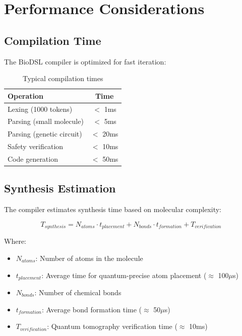\documentclass[12pt,a4paper]{article}
\begin{document}
\section{Performance Considerations}

\subsection{Compilation Time}

The BioDSL compiler is optimized for fast iteration:

\begin{table}[H]
\centering
\begin{tabular}{lc}
\toprule
\textbf{Operation} & \textbf{Time} \\
\midrule
Lexing (1000 tokens) & $<$ 1ms \\
Parsing (small molecule) & $<$ 5ms \\
Parsing (genetic circuit) & $<$ 20ms \\
Safety verification & $<$ 10ms \\
Code generation & $<$ 50ms \\
\bottomrule
\end{tabular}
\caption{Typical compilation times}
\end{table}

\subsection{Synthesis Estimation}

The compiler estimates synthesis time based on molecular complexity:

\begin{equation}
T_{synthesis} = N_{atoms} \cdot t_{placement} + N_{bonds} \cdot t_{formation} + T_{verification}
\end{equation}

Where:
\begin{itemize}
    \item $N_{atoms}$: Number of atoms in the molecule
    \item $t_{placement}$: Average time for quantum-precise atom placement ($\approx$ 100$\mu$s)
    \item $N_{bonds}$: Number of chemical bonds
    \item $t_{formation}$: Average bond formation time ($\approx$ 50$\mu$s)
    \item $T_{verification}$: Quantum tomography verification time ($\approx$ 10ms)
\end{itemize}
\end{document}
